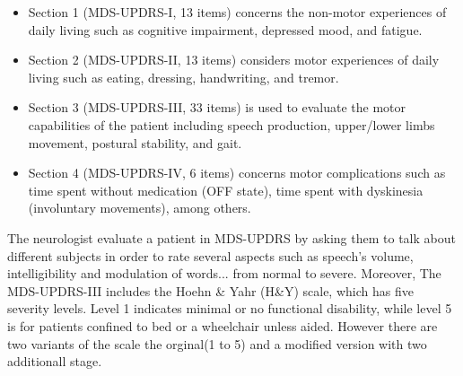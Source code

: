\begin{itemize}
    \item  Section 1 (MDS-UPDRS-I, 13 items) concerns the non-motor experiences of daily living
          such as cognitive impairment, depressed mood, and fatigue.
    \item Section 2 (MDS-UPDRS-II, 13 items) considers motor experiences of daily living such as
          eating, dressing, handwriting, and tremor.
    \item Section 3 (MDS-UPDRS-III, 33 items) is used to evaluate the motor capabilities of the
          patient including speech production, upper/lower limbs movement, postural stability, and
          gait.
    \item Section 4 (MDS-UPDRS-IV, 6 items) concerns motor complications such as time spent
          without medication (OFF state), time spent with dyskinesia (involuntary movements),
          among others.
\end{itemize}
The neurologist evaluate a patient in MDS-UPDRS by asking them to talk about different subjects in order to rate several aspects such as speech’s volume, intelligibility and modulation of words... from normal to severe.
Moreover, The MDS-UPDRS-III includes the Hoehn \& Yahr (H\&Y) scale, which has five severity levels.
Level 1 indicates minimal or no functional disability, while level 5 is for patients confined to bed or a wheelchair unless aided.
However there are two variants of the scale the orginal(1 to 5) and a modified version with two additionall stage.

